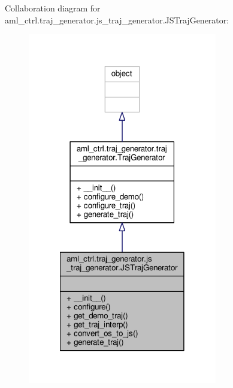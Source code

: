 Collaboration diagram for aml\-\_\-ctrl.\-traj\-\_\-generator.\-js\-\_\-traj\-\_\-generator.\-J\-S\-Traj\-Generator\-:
\nopagebreak
\begin{figure}[H]
\begin{center}
\leavevmode
\includegraphics[width=234pt]{classaml__ctrl_1_1traj__generator_1_1js__traj__generator_1_1_j_s_traj_generator__coll__graph}
\end{center}
\end{figure}
